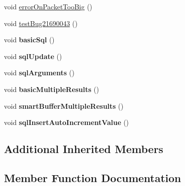 \begin{DoxyCompactItemize}
\item 
void \mbox{\hyperlink{classtestsuite_1_1x_1_1devapi_1_1_session_test_a206da8616c724f03c86c7d51b63b793f}{error\+On\+Packet\+Too\+Big}} ()
\item 
void \mbox{\hyperlink{classtestsuite_1_1x_1_1devapi_1_1_session_test_a6ebdd3c58a18e1b8b58788a16c7b4b46}{test\+Bug21690043}} ()
\item 
\mbox{\label{classtestsuite_1_1x_1_1devapi_1_1_session_test_a01badad6c403d0997ca67aa9edfc4c35}} 
void {\bfseries basic\+Sql} ()
\item 
\mbox{\label{classtestsuite_1_1x_1_1devapi_1_1_session_test_a1abc724920fb0ef09e727e0cb58e8dd8}} 
void {\bfseries sql\+Update} ()
\item 
\mbox{\label{classtestsuite_1_1x_1_1devapi_1_1_session_test_aae134fc3879782dee3f0d6b3944bcab9}} 
void {\bfseries sql\+Arguments} ()
\item 
\mbox{\label{classtestsuite_1_1x_1_1devapi_1_1_session_test_ae521014d977b1b3fd5f8add8e7ab5e14}} 
void {\bfseries basic\+Multiple\+Results} ()
\item 
\mbox{\label{classtestsuite_1_1x_1_1devapi_1_1_session_test_a2508aa60fe1363ad0b87c110cd16909a}} 
void {\bfseries smart\+Buffer\+Multiple\+Results} ()
\item 
\mbox{\label{classtestsuite_1_1x_1_1devapi_1_1_session_test_a417e20675ceeb33d9c3660de53bd118d}} 
void {\bfseries sql\+Insert\+Auto\+Increment\+Value} ()
\end{DoxyCompactItemize}
\subsection*{Additional Inherited Members}


\subsection{Member Function Documentation}
\mbox{\label{classtestsuite_1_1x_1_1devapi_1_1_session_test_a206da8616c724f03c86c7d51b63b793f}} 
